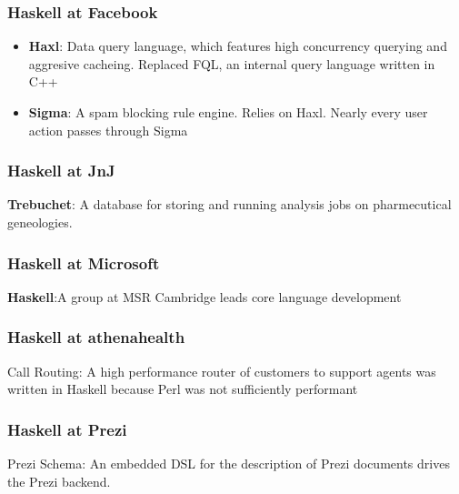 
\begin{frame}
\frametitle{Haskell at Facebook}

\begin{itemize}
    \item {\bf Haxl}: Data query language, which features high concurrency querying
            and aggresive cacheing. Replaced FQL, an internal query language
            written in C++
    \item {\bf Sigma}: A spam blocking rule engine. Relies on Haxl. Nearly every user action
             passes through Sigma
\end{itemize}

\end{frame}


\begin{frame}
\frametitle{Haskell at JnJ}

{\bf Trebuchet}: A database for storing and running analysis jobs on pharmecutical
                 geneologies.

\end{frame}


\begin{frame}
\frametitle{Haskell at Microsoft}

{\bf Haskell}:A group at MSR Cambridge leads core language development

\end{frame}


\begin{frame}
\frametitle{Haskell at athenahealth}

{Call Routing}: A high performance router of customers to support agents was
                written in Haskell because Perl was not sufficiently performant

\end{frame}



\begin{frame}
\frametitle{Haskell at Prezi}

{Prezi Schema}: An embedded DSL for the description of Prezi documents drives the
                Prezi backend.

\end{frame}


